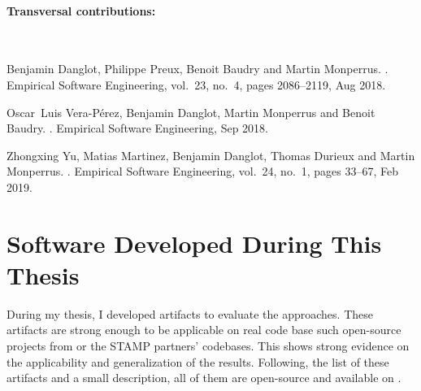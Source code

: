 \paragraph{Transversal contributions:}
~\\
\renewcommand\bibname{~}
\vspace{-2.8cm}
\let\oldaddcontentsline\addcontentsline%
\renewcommand{\addcontentsline}[3]{}%
\begingroup
\let\clearpage\relax
\begin{thebibliography}{xxxx}
	
	Benjamin Danglot, Philippe Preux, Benoit Baudry and Martin Monperrus.
	.
	\newblock Empirical Software Engineering, vol.~23, no.~4, pages 2086--2119, Aug
	2018.
	
	Oscar~Luis Vera-P{\'e}rez, Benjamin Danglot, Martin Monperrus and Benoit
	Baudry.
	.
	\newblock Empirical Software Engineering, Sep 2018.
	
	Zhongxing Yu, Matias Martinez, Benjamin Danglot, Thomas Durieux and Martin
	Monperrus.
	.
	\newblock Empirical Software Engineering, vol.~24, no.~1, pages 33--67, Feb
	2019.
	
\end{thebibliography}
\endgroup
\let\addcontentsline\oldaddcontentsline%

\section{Software Developed During This Thesis}
\label{sec:intro:software}

During my thesis, I developed artifacts to evaluate the approaches.
These artifacts are strong enough to be applicable on real code base such open-source projects from \gh or the STAMP partners' codebases.
This shows strong evidence on the applicability and generalization of the results.
Following, the list of these artifacts and a small description, all of them are open-source and available on \gh.

